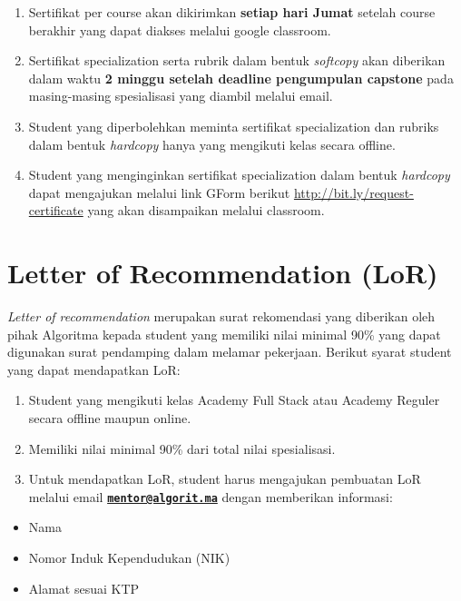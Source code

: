 \documentclass[
]{book}
\providecommand{\tightlist}{%
  \setlength{\itemsep}{0pt}\setlength{\parskip}{0pt}}
\begin{document}
\begin{enumerate}
\def\labelenumi{\arabic{enumi}.}
\tightlist
\item
  Sertifikat per course akan dikirimkan \textbf{setiap hari Jumat} setelah course berakhir yang dapat diakses melalui google classroom.
\item
  Sertifikat specialization serta rubrik dalam bentuk \emph{softcopy} akan diberikan dalam waktu \textbf{2 minggu setelah deadline pengumpulan capstone} pada masing-masing spesialisasi yang diambil melalui email.
\item
  Student yang diperbolehkan meminta sertifikat specialization dan rubriks dalam bentuk \emph{hardcopy} hanya yang mengikuti kelas secara offline.\\
\item
  Student yang menginginkan sertifikat specialization dalam bentuk \emph{hardcopy} dapat mengajukan melalui link GForm berikut \url{http://bit.ly/request-certificate} yang akan disampaikan melalui classroom.
\end{enumerate}

\hypertarget{letter-of-recommendation-lor}{%
\section{Letter of Recommendation (LoR)}\label{letter-of-recommendation-lor}}

\emph{Letter of recommendation} merupakan surat rekomendasi yang diberikan oleh pihak Algoritma kepada student yang memiliki nilai minimal 90\% yang dapat digunakan surat pendamping dalam melamar pekerjaan. Berikut syarat student yang dapat mendapatkan LoR:

\begin{enumerate}
\def\labelenumi{\arabic{enumi}.}
\tightlist
\item
  Student yang mengikuti kelas Academy Full Stack atau Academy Reguler secara offline maupun online.
\item
  Memiliki nilai minimal 90\% dari total nilai spesialisasi.
\item
  Untuk mendapatkan LoR, student harus mengajukan pembuatan LoR melalui email \textbf{\href{mailto:mentor@algorit.ma}{\nolinkurl{mentor@algorit.ma}}} dengan memberikan informasi:
\end{enumerate}

\begin{itemize}
\tightlist
\item
  Nama
\item
  Nomor Induk Kependudukan (NIK)
\item
  Alamat sesuai KTP
\end{itemize}
\end{document}
